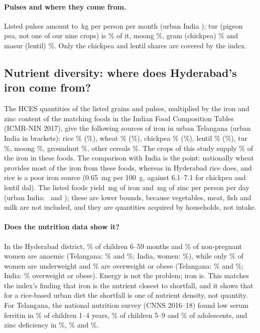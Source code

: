 \paragraph{Pulses and where they come from.} Listed pulses amount to \hqTgUrbanKgPulses\,kg per person per
month (urban India \hqInUrbanKgPulses); tur (pigeon pea, not one of our nine crops) is \hqTgUrbanShareTur\% of it,
moong \hqTgUrbanShareMoong\%, gram (chickpea) \hqTgUrbanShareChick\% and masur (lentil) \hqTgUrbanShareLentil\%.
Only the chickpea and lentil shares are covered by the index.

\subsection{Nutrient diversity: where does Hyderabad's iron come from?}
The HCES quantities of the listed grains and pulses, multiplied by the iron and zinc content of the matching
foods in the Indian Food Composition Tables (ICMR-NIN 2017), give the following sources of iron in urban Telangana
(urban India in brackets): rice \hqTgUrbanFeRice\% (\hqInUrbanFeRice\%), wheat \hqTgUrbanFeWheat\%
(\hqInUrbanFeWheat\%), chickpea \hqTgUrbanFeChickpea\% (\hqInUrbanFeChickpea\%), lentil \hqTgUrbanFeLentil\%
(\hqInUrbanFeLentil\%), tur \hqTgUrbanFeTur\%, moong \hqTgUrbanFeMoong\%, groundnut \hqTgUrbanFeGroundnut\%, other
cereals \hqTgUrbanFeOtherCereal\%. The crops of this study supply \hqTgUrbanFeStudy\% of the iron in these foods.
The comparison with India is the point: nationally wheat provides most of the iron from these foods, whereas in
Hyderabad rice does, and rice is a poor iron source (\SI{0.65}{mg} per \SI{100}{g}, against 6.1--7.1 for
chickpea and lentil dal). The listed foods yield \hqTgUrbanFeListed\,mg of iron and \hqTgUrbanZnListed\,mg of zinc
per person per day (urban India: \hqInUrbanFeListed\ and \hqInUrbanZnListed); these are lower bounds, because
vegetables, meat, fish and milk are not included, and they are quantities acquired by households, not intake.

\paragraph{Does the nutrition data show it?} In the Hyderabad district, \hydAnaemChild\% of children 6--59 months
and \hydAnaemNPW\% of non-pregnant women are anaemic (Telangana: \tgAnaemChild\% and \tgAnaemNPW\%; India,
women: \inAnaemNPW\%), while only \hydBmiLow\% of women are underweight and \hydOverweight\% are overweight or obese
(Telangana: \tgBmiLow\% and \tgOverweight\%; India: \inOverweight\% overweight or obese). Energy is not the
problem; iron is. This matches the index's finding that iron is the nutrient closest to shortfall, and it shows
that for a rice-based urban diet the shortfall is one of nutrient density, not quantity. For Telangana,
the national nutrition survey (CNNS 2016--18) found low serum ferritin in \cnnsIronCFour\% of children 1--4 years,
\cnnsIronCNine\% of children 5--9 and \cnnsIronAdol\% of adolescents, and zinc deficiency in \cnnsZincCFour\%,
\cnnsZincCNine\% and \cnnsZincAdol\%.

